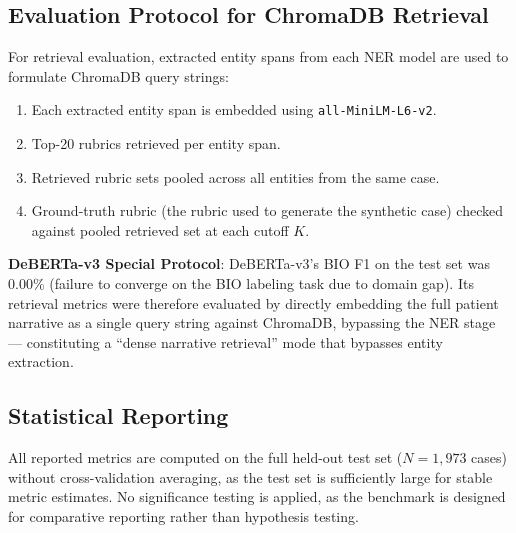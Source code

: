 \subsection{Evaluation Protocol for ChromaDB Retrieval}

For retrieval evaluation, extracted entity spans from each NER model are used to formulate ChromaDB query strings:
\begin{enumerate}
  \item Each extracted entity span is embedded using \texttt{all-MiniLM-L6-v2}.
  \item Top-20 rubrics retrieved per entity span.
  \item Retrieved rubric sets pooled across all entities from the same case.
  \item Ground-truth rubric (the rubric used to generate the synthetic case) checked against pooled retrieved set at each cutoff $K$.
\end{enumerate}

\textbf{DeBERTa-v3 Special Protocol}: DeBERTa-v3's BIO F1 on the test set was 0.00\% (failure to converge on the BIO labeling task due to domain gap). Its retrieval metrics were therefore evaluated by directly embedding the full patient narrative as a single query string against ChromaDB, bypassing the NER stage --- constituting a ``dense narrative retrieval'' mode that bypasses entity extraction.

\subsection{Statistical Reporting}

All reported metrics are computed on the full held-out test set ($N = 1,973$ cases) without cross-validation averaging, as the test set is sufficiently large for stable metric estimates. No significance testing is applied, as the benchmark is designed for comparative reporting rather than hypothesis testing.
